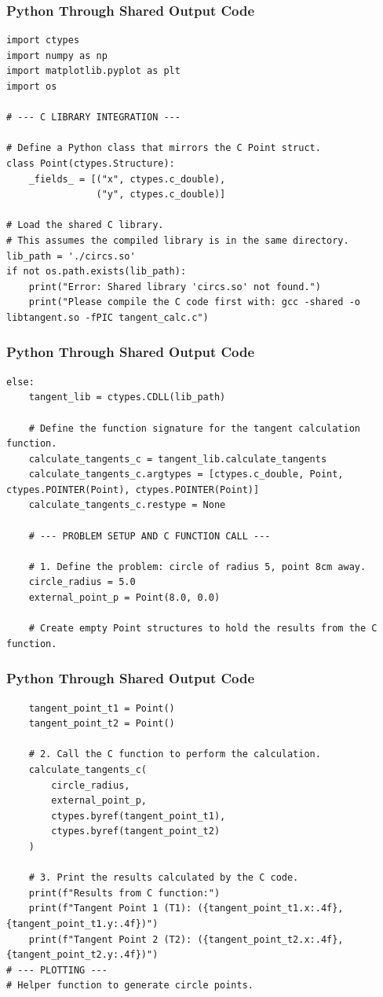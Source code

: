 \documentclass{beamer}
\begin{document}
\begin{frame}[fragile]
\frametitle{Python Through Shared Output Code}
\begin{lstlisting}
import ctypes
import numpy as np
import matplotlib.pyplot as plt
import os

# --- C LIBRARY INTEGRATION ---

# Define a Python class that mirrors the C Point struct.
class Point(ctypes.Structure):
    _fields_ = [("x", ctypes.c_double),
                ("y", ctypes.c_double)]

# Load the shared C library.
# This assumes the compiled library is in the same directory.
lib_path = './circs.so'
if not os.path.exists(lib_path):
    print("Error: Shared library 'circs.so' not found.")
    print("Please compile the C code first with: gcc -shared -o libtangent.so -fPIC tangent_calc.c")
    \end{lstlisting}
\end{frame}
\begin{frame}[fragile]
\frametitle{Python Through Shared Output Code}
\begin{lstlisting}
else:
    tangent_lib = ctypes.CDLL(lib_path)

    # Define the function signature for the tangent calculation function.
    calculate_tangents_c = tangent_lib.calculate_tangents
    calculate_tangents_c.argtypes = [ctypes.c_double, Point, ctypes.POINTER(Point), ctypes.POINTER(Point)]
    calculate_tangents_c.restype = None

    # --- PROBLEM SETUP AND C FUNCTION CALL ---

    # 1. Define the problem: circle of radius 5, point 8cm away.
    circle_radius = 5.0
    external_point_p = Point(8.0, 0.0)

    # Create empty Point structures to hold the results from the C function.
    \end{lstlisting}
\end{frame}
\begin{frame}[fragile]
\frametitle{Python Through Shared Output Code}
\begin{lstlisting}
    tangent_point_t1 = Point()
    tangent_point_t2 = Point()

    # 2. Call the C function to perform the calculation.
    calculate_tangents_c(
        circle_radius,
        external_point_p,
        ctypes.byref(tangent_point_t1),
        ctypes.byref(tangent_point_t2)
    )

    # 3. Print the results calculated by the C code.
    print(f"Results from C function:")
    print(f"Tangent Point 1 (T1): ({tangent_point_t1.x:.4f}, {tangent_point_t1.y:.4f})")
    print(f"Tangent Point 2 (T2): ({tangent_point_t2.x:.4f}, {tangent_point_t2.y:.4f})")
# --- PLOTTING ---
# Helper function to generate circle points.
\end{lstlisting}
\end{frame}
\end{document}

